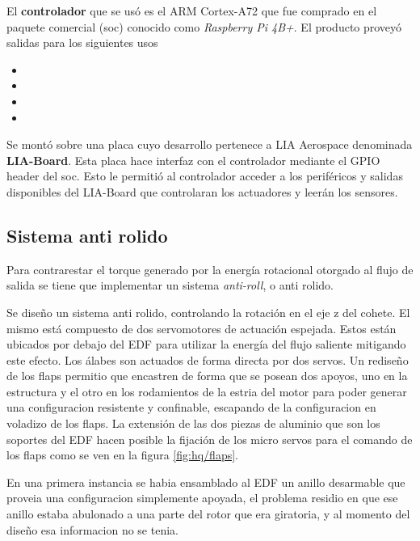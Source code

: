 \medskip

El \textbf{controlador} que se usó es el ARM Cortex-A72 que fue comprado en el paquete comercial (\gls{soc}) conocido como \textit{Raspberry Pi 4B+}. El producto proveyó salidas para los siguientes usos

\begin{itemize}
    \item {}
    \item {}
    \item {}
    \item {}
\end{itemize}

Se montó sobre una placa cuyo desarrollo pertenece a LIA Aerospace denominada \textbf{LIA-Board}. Esta placa hace interfaz con el controlador mediante el GPIO header del \gls{soc}. Esto le permitió al controlador acceder a los periféricos y salidas disponibles del LIA-Board que controlaran los actuadores y leerán los sensores.

\subsection{Sistema anti rolido}

Para contrarestar el torque generado por la energía rotacional otorgado al flujo de salida se tiene que implementar un sistema \textit{anti-roll}, o anti rolido.

\medskip

Se diseño un sistema anti rolido, controlando la rotación en el eje z del cohete. El mismo está compuesto de dos servomotores de actuación espejada. Estos están ubicados por debajo del EDF para utilizar la energía del flujo saliente mitigando este efecto. Los álabes son actuados de forma directa por dos servos. Un rediseño de los flaps permitio que encastren de forma que se posean dos
apoyos, uno en la estructura y el otro en los rodamientos de la estria del motor para poder generar una configuracion resistente y confinable, escapando de la configuracion en voladizo de los flaps. La extensión de las dos piezas de aluminio que son los
soportes del EDF hacen posible la fijación de los micro servos para el comando de los flaps como se ven en la figura \ref{fig:hq/flaps}.

\medskip

En una primera instancia se habia ensamblado al EDF un anillo
desarmable que proveia una configuracion simplemente apoyada, el problema residio en que ese anillo
estaba abulonado a una parte del rotor que era giratoria, y al momento del diseño esa informacion no
se tenia.

